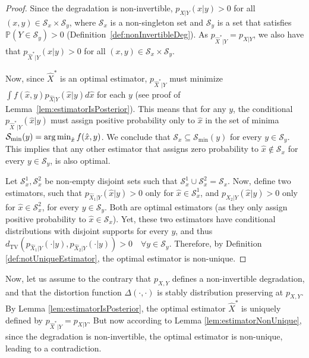 \begin{proof}
    Since the degradation is non-invertible, $p_{X|Y}(x|y)>0$ for all $(x,y)\in \mathcal{S}_x\times \mathcal{S}_y$, where $\mathcal{S}_x$ is a non-singleton set and $\mathcal{S}_y$ is a set that satisfies $\mathbb{P}(Y\in\mathcal{S}_y)>0$ (Definition~\ref{def:nonInvertibleDeg}). As $p_{\hat{X}^*|Y} = p_{X|Y}$, we also have that $p_{\hat{X}^*|Y}(x|y)>0$ for all $(x,y)\in \mathcal{S}_x\times \mathcal{S}_y$.
    
    Now, since $\hat{X}^*$ is an optimal estimator, $p_{\hat{X}^*|Y}$ must minimize $\int f(\hat{x},y) p_{\hat{X}|Y}(\hat{x}|y) d\hat{x}$ for each $y$ (see proof of Lemma~\ref{lem:estimatorIsPosterior}). This means that for any $y$, the conditional $p_{\hat{X}^*|Y}(\hat{x}|y)$ must assign positive probability only to $\hat{x}$ in the set of minima $\mathcal{S}_{\min}(y)=\operatorname{\arg\min}_{\hat{x}}f(\hat{x},y)$. We conclude 
    that $\mathcal{S}_{x}\subseteq \mathcal{S}_{\min}(y)$ for every $y \in \mathcal{S}_y$. This implies that any other estimator that assigns zero probability to  $\hat{x}\notin\mathcal{S}_x$ for every $y\in\mathcal{S}_y$, is also optimal.
    
    Let $\mathcal{S}_x^1,\mathcal{S}_x^2$ be non-empty disjoint sets such that $\mathcal{S}_x^1 \cup \mathcal{S}_x^2 = \mathcal{S}_x$. Now, define two estimators, such that $p_{\hat{X}_1|Y}(\hat{x}|y) > 0$ only for $\hat{x} \in \mathcal{S}_x^1$, and $p_{\hat{X}_2|Y}(\hat{x}|y) > 0$ only for $\hat{x} \in \mathcal{S}_x^2$, for every $y \in \mathcal{S}_y$. Both are optimal estimators (as they only assign positive probability to $\hat{x} \in \mathcal{S}_x$). Yet, these two estimators have conditional distributions with disjoint supports for every $y$, and thus $d_{\text{TV}}(p_{\hat{X}_1|Y}(\cdot|y),p_{\hat{X}_2|Y}(\cdot|y))>0 \quad \forall y \in \mathcal{S}_y$. Therefore, by Definition \ref{def:notUniqueEstimator}, the optimal estimator is non-unique.
\end{proof}


Now, let us assume to the contrary that $p_{X,Y}$ defines a non-invertible degradation, and that the distortion function $\Delta(\cdot,\cdot)$ is stably distribution preserving at $p_{X,Y}$. By Lemma \ref{lem:estimatorIsPosterior}, the optimal estimator $\hat{X}^*$ is uniquely defined by $p_{\hat{X}^*|Y} = p_{X|Y}$. But now according to Lemma \ref{lem:estimatorNonUnique}, since the degradation is non-invertible, the optimal estimator is non-unique, leading to a contradiction.

